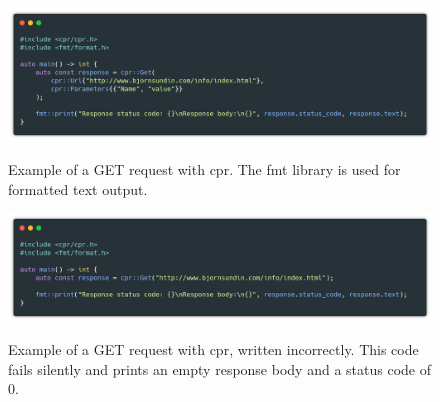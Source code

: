 \documentclass[12pt, a4paper]{article}
\begin{document}
\begin{figure}[hp]
	\centering
	\caption{Example of a GET request with cpr. The fmt library is used for formatted text output.}
	\includegraphics[width=\textwidth]{cpr_example}
	\label{fig:cpr_example}
\end{figure}

\begin{figure}[hp]
	\centering
	\caption{Example of a GET request with cpr, written incorrectly. This code fails silently and prints an empty response body and a status code of 0.}
	\includegraphics[width=\textwidth]{cpr_example_incorrect}
	\label{fig:cpr_example_incorrect}
\end{figure}
\end{document}
